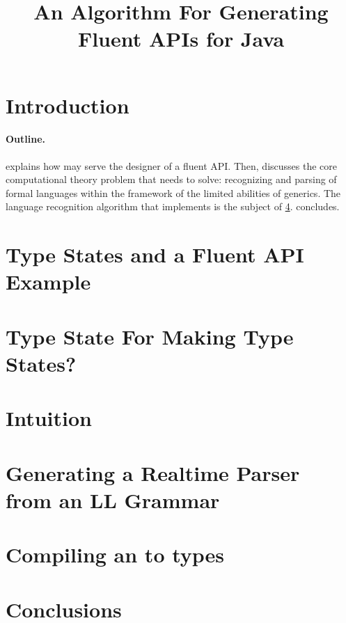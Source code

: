 \documentclass[nonatbib,preprint,numbers]{sigplanconf}
\title
{%
  An Algorithm For Generating Fluent APIs for  Java 
}
\begin{document}
\maketitle

\begin{abstract}
  
\end{abstract}

\section{Introduction}


\paragraph{Outline.}  explains how \Fajita may serve the
designer of a fluent API\@.
Then,  discusses the core computational theory problem
that \Fajita needs to solve: recognizing and parsing of formal languages within
the framework of the limited abilities of \Java generics.  The language
recognition algorithm that \Fajita implements is the subject of
\cref{section:intuition}.   concludes.

\section{Type States and a Fluent API Example}
\label{section:example}


\section{Type State For Making Type States?}
\label{section:generalization}


\section{Intuition}
\label{section:intuition}


\section{Generating a Realtime Parser \\ from an LL Grammar}
\label{section:algorithm}


\section{Compiling an \RLLp to \Java types}
\label{section:background}



\section{Conclusions}
\label{section:zz}


\small

\end{document}
